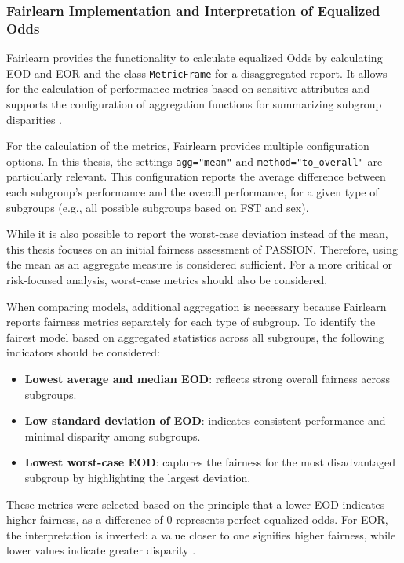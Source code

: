 \documentclass[12pt, a4paper, oneside]{book}   	%
\begin{document}
		\subsubsection{Fairlearn Implementation and Interpretation of Equalized Odds}
		\gls{Fairlearn} provides the functionality to calculate equalized Odds by calculating \gls{EOD} and \gls{EOR} and the class \texttt{MetricFrame} for a disaggregated report. It allows for the calculation of performance metrics based on sensitive attributes and supports the configuration of aggregation functions for summarizing subgroup disparities \autocite{Fairlearn_nodate}.
		
		For the calculation of the metrics, \gls{Fairlearn} provides multiple configuration options. In this thesis, the settings \texttt{agg="mean"} and \texttt{method="to\_overall"} are particularly relevant. This configuration reports the average difference between each subgroup’s performance and the overall performance, for a given type of subgroups (e.g., all possible subgroups based on \gls{FST} and sex).
		
		While it is also possible to report the worst-case deviation instead of the mean, this thesis focuses on an initial fairness assessment of PASSION. Therefore, using the mean as an aggregate measure is considered sufficient. For a more critical or risk-focused analysis, worst-case metrics should also be considered.
		
		When comparing models, additional aggregation is necessary because \gls{Fairlearn} reports fairness metrics separately for each type of subgroup. To identify the fairest model based on aggregated statistics across all subgroups, the following indicators should be considered:
		\begin{itemize}
			\item \textbf{Lowest average and median \gls{EOD}}: reflects strong overall fairness across subgroups.
			\item \textbf{Low standard deviation of \gls{EOD}}: indicates consistent performance and minimal disparity among subgroups.
			\item \textbf{Lowest worst-case \gls{EOD}}: captures the fairness for the most disadvantaged subgroup by highlighting the largest deviation.
		\end{itemize}
		These metrics were selected based on the principle that a lower \gls{EOD} indicates higher fairness, as a difference of 0 represents perfect equalized odds. For \gls{EOR}, the interpretation is inverted: a value closer to one signifies higher fairness, while lower values indicate greater disparity \autocite{Fairlearn_nodate}.
		
\end{document}

